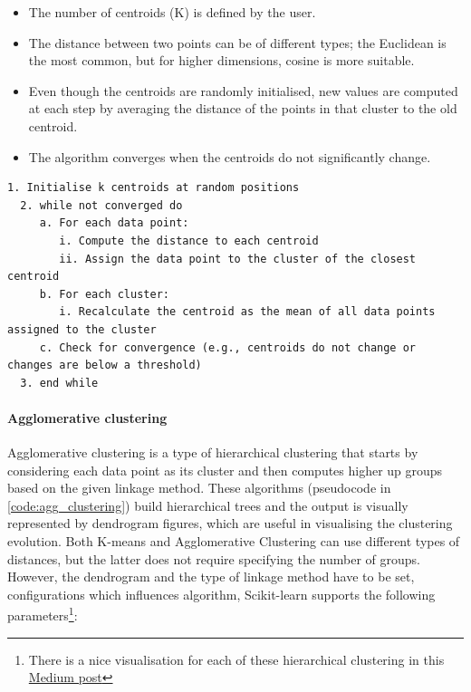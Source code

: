 \begin{itemize}
  \item The number of centroids (K) is defined by the user.
  \item The distance between two points can be of different types; the Euclidean is the most common, but for higher dimensions, cosine is more suitable.
  \item Even though the centroids are randomly initialised, new values are computed at each step by averaging the distance of the points in that cluster to the old centroid.
  \item The algorithm converges when the centroids do not significantly change.
\end{itemize}

\begin{lstlisting}[float=!htb, caption={K-means pseudocode}, label={code:k-means}]
  1. Initialise k centroids at random positions
  2. while not converged do
     a. For each data point:
        i. Compute the distance to each centroid
        ii. Assign the data point to the cluster of the closest centroid
     b. For each cluster:
        i. Recalculate the centroid as the mean of all data points assigned to the cluster
     c. Check for convergence (e.g., centroids do not change or changes are below a threshold)
  3. end while
\end{lstlisting}


\paragraph*{Agglomerative clustering}

Agglomerative clustering is a type of hierarchical clustering that starts by considering each data point as its cluster and then computes higher up groups based on the given linkage method. These algorithms (pseudocode in \cref{code:agg_clustering}) build hierarchical trees and the output is visually represented by dendrogram figures, which are useful in visualising the clustering evolution. Both K-means and Agglomerative Clustering can use different types of distances, but the latter does not require specifying the number of groups. However, the dendrogram and the type of linkage method have to be set, configurations which influences algorithm, Scikit-learn supports the following parameters\footnote{There is a nice visualisation for each of these hierarchical clustering in this \href{https://towardsdatascience.com/machine-learning-algorithms-part-12-hierarchical-agglomerative-clustering-example-in-python-1e18e0075019}{Medium post}}:

